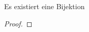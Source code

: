 \begin{Satz}
	Es existiert eine Bijektion
	\begin{center}
	\end{center}
\begin{proof}
	
\end{proof}
\end{Satz}

